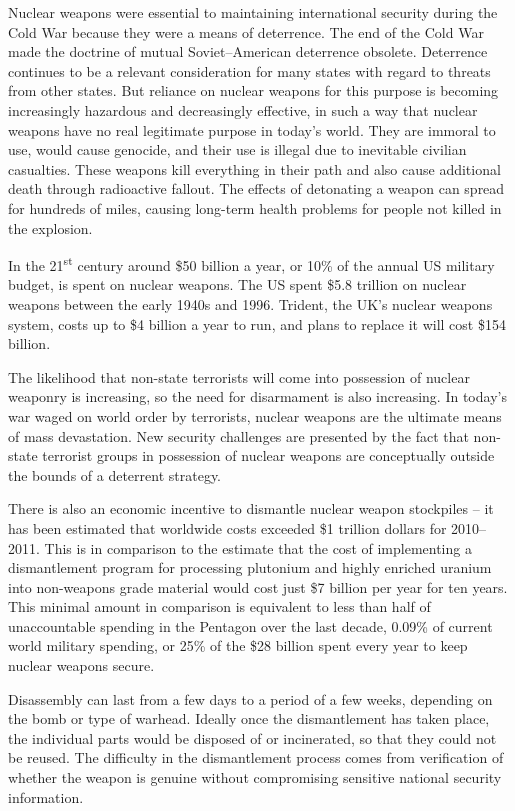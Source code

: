 \documentclass[twoside,titlepage,11pt,twocolumn,a4paper]{article}
\begin{document}
Nuclear weapons were essential to maintaining international security
during the Cold War because they were a means of deterrence. The end
of the Cold War made the doctrine of mutual Soviet--American
deterrence obsolete. Deterrence continues to be a relevant
consideration for many states with regard to threats from other
states. But reliance on nuclear weapons for this purpose is becoming
increasingly hazardous and decreasingly effective, in such a way that
nuclear weapons have no real legitimate purpose in today’s world. They
are immoral to use, would cause genocide, and their use is illegal due
to inevitable civilian casualties. These weapons kill everything in
their path and also cause additional death through radioactive
fallout. The effects of detonating a weapon can spread for hundreds of
miles, causing long-term health problems for people not killed in the
explosion.

In the 21\textsuperscript{st} century around \$50 billion a year, or
10\% of the annual US military budget, is spent on nuclear
weapons. \citep{USspending} The US spent \$5.8 trillion on nuclear
weapons between the early 1940s and 1996. Trident, the UK's nuclear
weapons system, costs up to \$4 billion a year to run, and plans to
replace it will cost \$154 billion.

The likelihood that non-state terrorists will come into possession of
nuclear weaponry is increasing, so the need for disarmament is also
increasing. In today's war waged on world order by terrorists, nuclear
weapons are the ultimate means of mass devastation. New security
challenges are presented by the fact that non-state terrorist groups
in possession of nuclear weapons are conceptually outside the bounds
of a deterrent strategy.

There is also an economic incentive to dismantle nuclear weapon
stockpiles -- it has been estimated that worldwide costs exceeded \$1
trillion dollars for 2010--2011. \citep{worldSpending} This is in
comparison to the estimate that the cost of implementing a
dismantlement program for processing plutonium and highly enriched
uranium into non-weapons grade material would cost just \$7 billion
per year for ten years. \citep{worldSafe} This minimal amount in
comparison is equivalent to less than half of unaccountable spending
in the Pentagon over the last decade, 0.09\% of current world military
spending, or 25\% of the \$28 billion spent every year to keep nuclear
weapons secure.

Disassembly can last from a few days to a period of a few weeks,
depending on the bomb or type of warhead. \citep{kopte1996} Ideally
once the dismantlement has taken place, the individual parts would be
disposed of or incinerated, so that they could not be reused. The
difficulty in the dismantlement process comes from verification of
whether the weapon is genuine without compromising sensitive national
security information.
\end{document}
